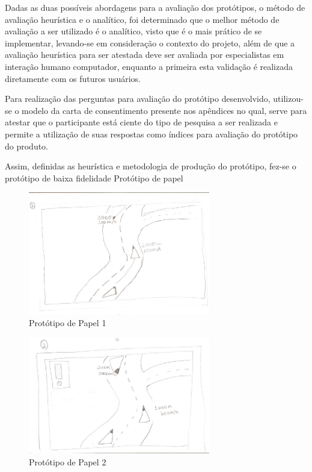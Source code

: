  Dadas as duas possíveis abordagens para a avaliação dos protótipos, o método de avaliação heurística e o analítico, foi determinado que o melhor método de avaliação a ser utilizado é o analítico, visto que é o mais prático de se implementar, levando-se em consideração o contexto do projeto, além de que a avaliação heurística para ser atestada deve ser avaliada por especialistas em interação humano computador, enquanto a primeira esta validação é realizada diretamente com os futuros usuários.

Para realização das perguntas para avaliação do protótipo desenvolvido, utilizou-se o modelo da carta de consentimento presente nos apêndices no qual, serve para atestar que o participante está ciente do tipo de pesquisa a ser realizada e permite a utilização de suas respostas como índices para avaliação do protótipo do produto.

Assim, definidas as heurística e metodologia de produção do protótipo, fez-se o protótipo de baixa fidelidade
Protótipo de papel

\begin{figure}[!h]
  \centering
  \includegraphics[width=300px, scale=1]{figuras/prototipo1}
  \caption{Protótipo de Papel 1}
\label{fig:prototipo1}
\end{figure}

\begin{figure}[!h]
  \centering
  \includegraphics[width=300px, scale=1]{figuras/prototipo2}
  \caption{Protótipo de Papel 2}
\label{fig:prototipo2}
\end{figure}

